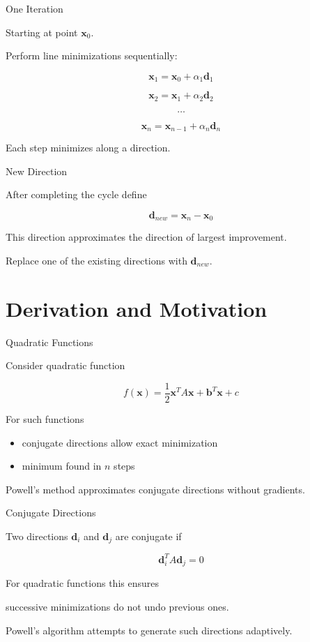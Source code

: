 \documentclass[aspectratio=169]{beamer}
\begin{document}
\begin{frame}{One Iteration}

Starting at point $\mathbf{x}_0$.

Perform line minimizations sequentially:

\[
\mathbf{x}_1 = \mathbf{x}_0 + \alpha_1 \mathbf{d}_1
\]

\[
\mathbf{x}_2 = \mathbf{x}_1 + \alpha_2 \mathbf{d}_2
\]

\[
\dots
\]

\[
\mathbf{x}_n = \mathbf{x}_{n-1} + \alpha_n \mathbf{d}_n
\]

Each step minimizes along a direction.
\end{frame}

\begin{frame}{New Direction}

After completing the cycle define

\[
\mathbf{d}_{new} =
\mathbf{x}_n - \mathbf{x}_0
\]

This direction approximates the direction of largest improvement.

Replace one of the existing directions with $\mathbf{d}_{new}$.
\end{frame}

\section{Derivation and Motivation}

\begin{frame}{Quadratic Functions}

Consider quadratic function

\[
f(\mathbf{x}) =
\frac12 \mathbf{x}^T A \mathbf{x}
+ \mathbf{b}^T \mathbf{x} + c
\]

For such functions

\begin{itemize}
\item conjugate directions allow exact minimization
\item minimum found in $n$ steps
\end{itemize}

Powell's method approximates conjugate directions without gradients.
\end{frame}

\begin{frame}{Conjugate Directions}

Two directions $\mathbf{d}_i$ and $\mathbf{d}_j$ are conjugate if

\[
\mathbf{d}_i^T A \mathbf{d}_j = 0
\]

For quadratic functions this ensures

successive minimizations do not undo previous ones.

Powell's algorithm attempts to generate such directions adaptively.
\end{frame}
\end{document}
